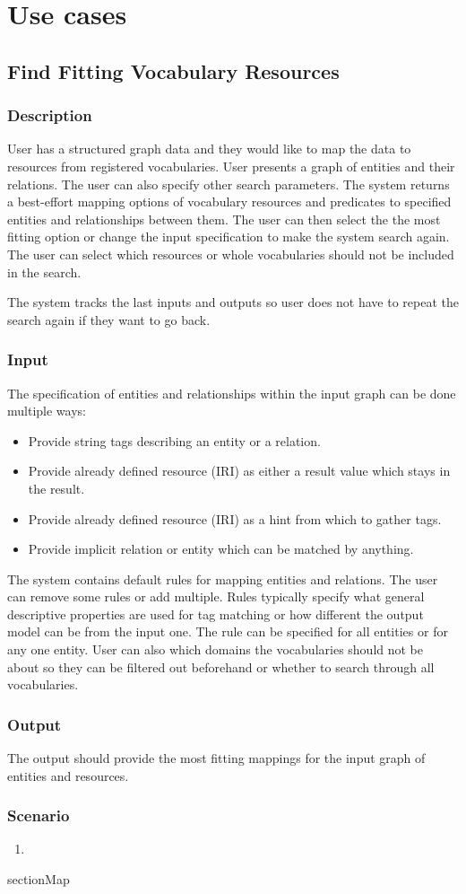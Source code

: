 \chapter{Use cases}

\section{Find Fitting Vocabulary Resources}

\subsection{Description}
User has a structured graph data and they would like to map the data to resources from registered vocabularies. User presents a graph of entities and their relations. The user can also specify other search parameters. The system returns a best-effort mapping options of vocabulary resources and predicates to specified entities and relationships between them. The user can then select the the most fitting option or change the input specification to make the system search again. The user can select which resources or whole vocabularies should not be included in the search.

The system tracks the last inputs and outputs so user does not have to repeat the search again if they want to go back. 

\subsection{Input}
The specification of entities and relationships within the input graph can be done multiple ways:
\begin{itemize}
    \item Provide string tags describing an entity or a relation.
    \item Provide already defined resource (IRI) as either a result value which stays in the result.
    \item Provide already defined resource (IRI) as a hint from which to gather tags.
    \item Provide implicit relation or entity which can be matched by anything.
\end{itemize}

The system contains default rules for mapping entities and relations. The user can remove some rules or add multiple. Rules typically specify what general descriptive properties are used for tag matching or how different the output model can be from the input one. The rule can be specified for all entities or for any one entity. User can also which domains the vocabularies should not be about so they can be filtered out beforehand or whether to search through all vocabularies.

\subsection{Output}
The output should provide the most fitting mappings for the input graph of entities and resources.

\subsection{Scenario}
\begin{enumerate}
    \item 
\end{enumerate}


section{Map }
